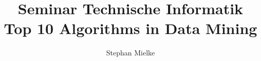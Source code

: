 \documentclass[12pt,journal,compsoc,ngerman]{IEEEtran}
\begin{document}
%
\title{Seminar Technische Informatik\\ Top 10 Algorithms in Data Mining}
%
%
%
%

\author{Stephan Mielke}

% 
%
\end{document}
